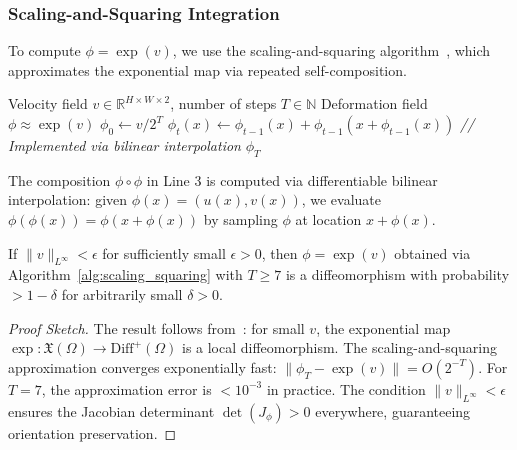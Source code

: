 \subsubsection{Scaling-and-Squaring Integration}

To compute $\phi = \exp(v)$, we use the scaling-and-squaring algorithm~\cite{arsigny2006logdiff}, which approximates the exponential map via repeated self-composition.

\begin{algorithm}[t]
\caption{Scaling-and-Squaring for Diffeomorphic Integration}
\label{alg:scaling_squaring}
\begin{algorithmic}[1]
\REQUIRE Velocity field $v \in \mathbb{R}^{H \times W \times 2}$, number of steps $T \in \mathbb{N}$
\ENSURE Deformation field $\phi \approx \exp(v)$
\STATE $\phi_0 \leftarrow v / 2^T$ 
    \STATE $\phi_t(x) \leftarrow \phi_{t-1}(x) + \phi_{t-1}(x + \phi_{t-1}(x))$ 
    \STATE \hspace{1cm} \textit{// Implemented via bilinear interpolation}
\ENDFOR
\RETURN $\phi_T$
\end{algorithmic}
\end{algorithm}

The composition $\phi \circ \phi$ in Line 3 is computed via differentiable bilinear interpolation: given $\phi(x) = (u(x), v(x))$, we evaluate $\phi(\phi(x)) = \phi(x + \phi(x))$ by sampling $\phi$ at location $x + \phi(x)$.

\begin{proposition}
\label{prop:diffeomorphism}
If $\|v\|_{L^\infty} < \epsilon$ for sufficiently small $\epsilon > 0$, then $\phi = \exp(v)$ obtained via Algorithm~\ref{alg:scaling_squaring} with $T \geq 7$ is a diffeomorphism with probability $> 1 - \delta$ for arbitrarily small $\delta > 0$.
\end{proposition}

\begin{proof}[Proof Sketch]
The result follows from~\cite{arsigny2006logdiff}: for small $v$, the exponential map $\exp: \mathfrak{X}(\Omega) \rightarrow \text{Diff}^+(\Omega)$ is a local diffeomorphism. The scaling-and-squaring approximation converges exponentially fast: $\|\phi_T - \exp(v)\| = O(2^{-T})$. For $T=7$, the approximation error is $< 10^{-3}$ in practice. The condition $\|v\|_{L^\infty} < \epsilon$ ensures the Jacobian determinant $\det(J_\phi) > 0$ everywhere, guaranteeing orientation preservation.
\end{proof}

